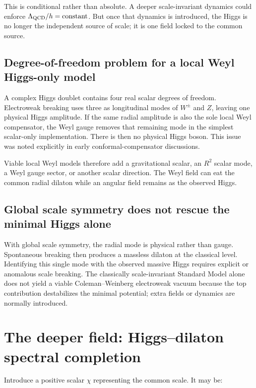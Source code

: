 \documentclass[11pt,a4paper]{article}
\begin{document}
This is conditional rather than absolute. A deeper scale-invariant dynamics could enforce $\Lambda_{\rm QCD}/h=\text{constant}$. But once that dynamics is introduced, the Higgs is no longer the independent source of scale; it is one field locked to the common source.

\subsection{Degree-of-freedom problem for a local Weyl Higgs-only model}

A complex Higgs doublet contains four real scalar degrees of freedom. Electroweak breaking uses three as longitudinal modes of $W^\pm$ and $Z$, leaving one physical Higgs amplitude. If the same radial amplitude is also the sole local Weyl compensator, the Weyl gauge removes that remaining mode in the simplest scalar-only implementation. There is then no physical Higgs boson. This issue was noted explicitly in early conformal-compensator discussions. \cite{Navarro2005}

Viable local Weyl models therefore add a gravitational scalar, an $R^2$ scalar mode, a Weyl gauge sector, or another scalar direction. The Weyl field can eat the common radial dilaton while an angular field remains as the observed Higgs. \cite{Ghilencea2019}

\subsection{Global scale symmetry does not rescue the minimal Higgs alone}

With global scale symmetry, the radial mode is physical rather than gauge. Spontaneous breaking then produces a massless dilaton at the classical level. Identifying this single mode with the observed massive Higgs requires explicit or anomalous scale breaking. The classically scale-invariant Standard Model alone does not yield a viable Coleman--Weinberg electroweak vacuum because the top contribution destabilizes the minimal potential; extra fields or dynamics are normally introduced. \cite{Foot2007}

\section{The deeper field: Higgs--dilaton spectral completion}

Introduce a positive scalar $\chi$ representing the common scale. It may be:
\end{document}
